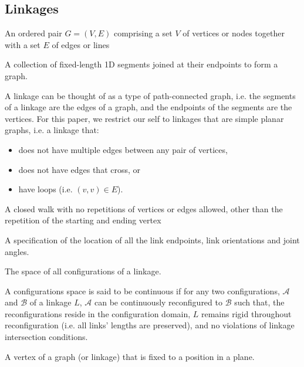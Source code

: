 \subsection{Linkages}
\begin{definition}[Graph]\label{def:linkages-2}
An ordered pair $G = (V, E)$ comprising a set $V$ of vertices or nodes together with a set $E$ of edges or lines
\end{definition} 
\begin{definition}[Linkage]\label{def:linkages-1}
A collection of fixed-length 1D segments joined at their endpoints to form a graph.
\end{definition} 
A linkage can be thought of as a type of path-connected graph, i.e. the segments of a linkage are the edges of a graph, and the endpoints of the segments are the vertices. For this paper, we restrict our self to linkages that are simple planar graphs, i.e. a linkage that:
\begin{itemize}
\item[\rn{1}] does not have multiple edges between any pair of vertices,
\item[\rn{2}] does not have edges that cross, or
\item[\rn{3}] have loops (i.e. $(v,v) \in E$).
\end{itemize}  
\begin{definition}[Cycle]\label{def:linkages-3}
 A closed walk with no repetitions of vertices or edges allowed, other than the repetition of the starting and ending vertex
\end{definition} 
\begin{definition}[Configuration]\label{def:linkages-6}
A specification of the location of all the link endpoints, link orientations and
joint angles.\cite{demaine2008geometric}
\end{definition}
\begin{definition}\label{def:linkages-7}
The space of all configurations of a linkage.
\end{definition} 
A configurations space is said to be continuous if for any two configurations, $\mathcal{A}$ and $\mathcal{B}$ of a linkage $L$, $\mathcal{A}$ can be continuously reconfigured to $\mathcal{B}$ such that, the reconfigurations reside in the configuration domain, $L$ remains rigid throughout reconfiguration (i.e. all links' lengths are preserved), and no violations of linkage intersection conditions. 
\begin{definition}\label{def:linkages-8}
A vertex of a graph (or linkage) that is fixed to a position in a plane.
\end{definition} 
